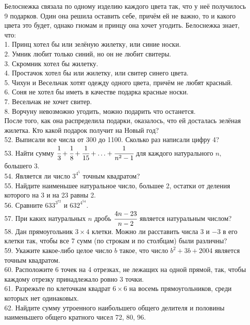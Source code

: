 Белоснежка связала по одному изделию каждого цвета так, что у неё получилось 9 подарков. Один она решила оставить себе, причём ей не важно, то и какого цвета это будет, однако гномам и принцу она хочет угодить. Белоснежка знает, что:\\
1. Принц хотел бы или зелёную жилетку, или синие носки.\\
2. Умник любит только синий, но он не любит свитеры.\\
3. Скромник хотел бы жилетку.\\
4. Простачок хотел бы или жилетку, или свитер синего цвета.\\
5. Чихун и Весельчак хотят одежду одного цвета, причём не любят красный.\\
6. Соня не хотел бы иметь в качестве подарка красные носки.\\
7. Весельчак не хочет свитер.\\
8. Ворчуну невозможно угодить, можно подарить что останется.\\
После того, как она распределила подарки, оказалось, что ей досталась зелёная жилетка. Кто какой подарок получит на Новый год?\\
52. Выписали все числа от 300 до 1100. Сколько раз написали цифру 4?\\
53. Найти сумму $\cfrac{1}{3}+\cfrac{1}{8}+\cfrac{1}{15}+\ldots+\cfrac{1}{n^2-1}$ для каждого натурального $n,$ большего 3.\\
54. Является ли число $3^{4^5}$ точным квадратом?\\
55. Найдите наименьшее натуральное число, большее 2, остатки от деления которого на 3 и на 23 равны 2.\\
56. Сравните $633^{3^{72}}$ и $632^{4^{54}}.$\\
57. При каких натуральных $n$ дробь $\cfrac{4n-23}{n-2}$ является натуральным числом?\\
58. Дан прямоугольник $3 \times 4$ клетки. Можно ли расставить числа $3$ и $-3$ в его клетки так, чтобы все 7 сумм (по строкам и по столбцам) были различны?\\
59. Укажите какое-либо целое число $b$ такое, что число $b^2+3b+2004$ является точным квадратом.\\
60. Расположите 6 точек на 4 отрезках, не лежащих на одной прямой, так, чтобы каждому отрезку принадлежало ровно 3 точки.\\
61. Разрежьте по клеточкам квадрат $6\times 6$ на восемь прямоугольников, среди которых нет одинаковых.\\
62. Найдите сумму утроенного наибольшего общего делителя и половины наименьшего общего кратного чисел 72, 80, 96.\\

